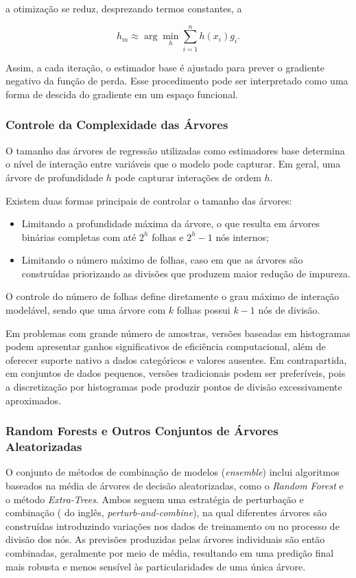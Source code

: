 a otimização se reduz, desprezando termos constantes, a

\[
h_m \approx \arg\min_{h} \sum_{i=1}^{n} h(x_i) g_i.
\]

Assim, a cada iteração, o estimador base é ajustado para prever o gradiente negativo da função de perda. Esse procedimento pode ser interpretado como uma forma de descida do gradiente em um espaço funcional.

\subsubsection{Controle da Complexidade das Árvores}

O tamanho das árvores de regressão utilizadas como estimadores base determina o nível de interação entre variáveis que o modelo pode capturar. Em geral, uma árvore de profundidade \( h \) pode capturar interações de ordem \( h \).

Existem duas formas principais de controlar o tamanho das árvores:

\begin{itemize}
\item Limitando a profundidade máxima da árvore, o que resulta em árvores binárias completas com até \( 2^h \) folhas e \( 2^h - 1 \) nós internos;
\item Limitando o número máximo de folhas, caso em que as árvores são construídas priorizando as divisões que produzem maior redução de impureza.
\end{itemize}

O controle do número de folhas define diretamente o grau máximo de interação modelável, sendo que uma árvore com \( k \) folhas possui \( k - 1 \) nós de divisão.

Em problemas com grande número de amostras, versões baseadas em histogramas podem apresentar ganhos significativos de eficiência computacional, além de oferecer suporte nativo a dados categóricos e valores ausentes. Em contrapartida, em conjuntos de dados pequenos, versões tradicionais podem ser preferíveis, pois a discretização por histogramas pode produzir pontos de divisão excessivamente aproximados.


\subsubsection{Random Forests e Outros Conjuntos de Árvores Aleatorizadas}

O conjunto de métodos de combinação de modelos (\textit{ensemble}) inclui algoritmos baseados na média de árvores de decisão aleatorizadas, como o \textit{Random Forest} e o método \textit{Extra-Trees}. Ambos seguem uma estratégia de perturbação e combinação ( do inglês, \textit{perturb-and-combine}), na qual diferentes árvores são construídas introduzindo variações nos dados de treinamento ou no processo de divisão dos nós. As previsões produzidas pelas árvores individuais são então combinadas, geralmente por meio de média, resultando em uma predição final mais robusta e menos sensível às particularidades de uma única árvore.

